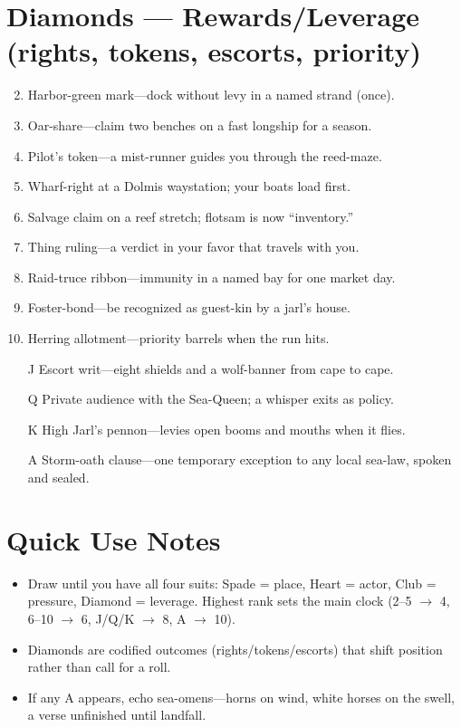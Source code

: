 \section*{Diamonds --- Rewards/Leverage (rights, tokens, escorts, priority)}
\label{sec:linn-rewards}
\begin{enumerate}
\setcounter{enumi}{1}
\item Harbor-green mark---dock without levy in a named strand (once).
\item Oar-share---claim two benches on a fast longship for a season.
\item Pilot's token---a mist-runner guides you through the reed-maze.
\item Wharf-right at a Dolmis waystation; your boats load first.
\item Salvage claim on a reef stretch; flotsam is now ``inventory.''
\item Thing ruling---a verdict in your favor that travels with you.
\item Raid-truce ribbon---immunity in a named bay for one market day.
\item Foster-bond---be recognized as guest-kin by a jarl's house.
\item Herring allotment---priority barrels when the run hits.
\item[J] Escort writ---eight shields and a wolf-banner from cape to cape.
\item[Q] Private audience with the Sea-Queen; a whisper exits as policy.
\item[K] High Jarl's pennon---levies open booms and mouths when it flies.
\item[A] Storm-oath clause---one temporary exception to any local sea-law, spoken and sealed.
\end{enumerate}

\section*{Quick Use Notes}
\label{sec:linn-quick-use}
\begin{itemize}
\item Draw until you have all four suits: Spade = place, Heart = actor, Club = pressure, Diamond = leverage. Highest rank sets the main clock (2--5 $\rightarrow$ 4, 6--10 $\rightarrow$ 6, J/Q/K $\rightarrow$ 8, A $\rightarrow$ 10).
\item Diamonds are codified outcomes (rights/tokens/escorts) that shift position rather than call for a roll.
\item If any A appears, echo sea-omens---horns on wind, white horses on the swell, a verse unfinished until landfall.
\end{itemize}

